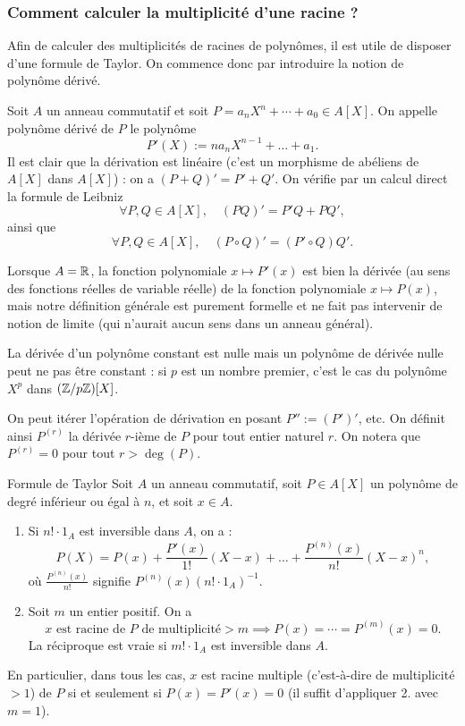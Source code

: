 \documentclass[]{report}
\begin{document}
\subsubsection{Comment calculer la multiplicité d'une racine ?}

Afin de calculer des multiplicités de racines de polynômes, il est utile de disposer d'une formule de Taylor. On commence donc par introduire la notion de polynôme dérivé.

\begin{df}{}{}
    Soit $A$ un anneau commutatif et soit $P = a_n X^n + \cdots + a_0 \in A[X]$. On appelle polynôme dérivé de $P$ le polynôme
    \[P'(X) := n a_n X^{n-1} + \dots + a_1.\]
    Il est clair que la dérivation est linéaire (c'est un morphisme de \grs abéliens de $A[X]$ dans $A[X]$) : on a $(P + Q)' = P' + Q'$. On vérifie par un calcul direct la formule de Leibniz
    \[\forall P, Q \in A[X], \quad (PQ)' = P'Q + PQ',\]
    ainsi que
    \[\forall P, Q \in A[X], \quad (P \circ Q)' = (P' \circ Q) Q'.\]
\end{df}

\begin{re}{}{}
    Lorsque $A = \mathbb{R}$, la fonction polynomiale $x \mapsto P'(x)$ est bien la dérivée (au sens des fonctions réelles de variable réelle) de la fonction polynomiale $x \mapsto P(x)$, mais notre définition générale est purement formelle et ne fait pas intervenir de notion de limite (qui n'aurait aucun sens dans un anneau général).

    La dérivée d'un polynôme constant est nulle mais un polynôme de dérivée nulle peut ne pas être constant : si $p$ est un nombre premier, c'est le cas du polynôme $X^p$ dans $(\mathbb{Z}/p\mathbb{Z})[X]$.

    On peut itérer l'opération de dérivation en posant $P'' := (P')'$, etc. On définit ainsi $P^{(r)}$ la dérivée $r$-ième de $P$ pour tout entier naturel $r$. On notera que $P^{(r)} = 0$ pour tout $r > \deg(P)$.
\end{re}

\begin{prop}{Formule de Taylor}{}
    Soit $A$ un anneau commutatif, soit $P \in A[X]$ un polynôme de degré inférieur ou égal à $n$, et soit $x \in A$.
    \begin{enumerate}
        \item Si $n! \cdot 1_A$ est inversible dans $A$, on a :
        \[P(X) = P(x) + \frac{P'(x)}{1!}(X - x) + \dots + \frac{P^{(n)}(x)}{n!}(X - x)^n,\]
        où $\frac{P^{(n)}(x)}{n!}$ signifie $P^{(n)}(x)(n! \cdot 1_A)^{-1}$.
        \item Soit $m$ un entier positif. On a
        \[x \text{ est racine de } P \text{ de multiplicité} > m \implies P(x) = \cdots = P^{(m)}(x) = 0.\]
        La réciproque est vraie si $m! \cdot 1_A$ est inversible dans $A$.
    \end{enumerate}
    En particulier, dans tous les cas, $x$ est racine multiple (c'est-à-dire de multiplicité $> 1$) de $P$ si et seulement si $P(x) = P'(x) = 0$ (il suffit d'appliquer 2. avec $m = 1$).
\end{prop}
\end{document}
